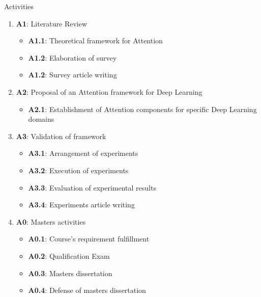 \documentclass[10pt]{beamer}
\begin{document}
\begin{frame}{Activities}
    \begin{enumerate}
        \item \textbf{A1}: Literature Review
        \begin{itemize}
            \item \textbf{A1.1}: Theoretical framework for Attention
            \item \textbf{A1.2}: Elaboration of survey
            \item \textbf{A1.2}: Survey article writing
        \end{itemize}
        \item \textbf{A2}: Proposal of an Attention framework for Deep Learning
        \begin{itemize}
            \item \textbf{A2.1}: Establishment of Attention components for specific Deep Learning domains
        \end{itemize}
        \item \textbf{A3}: Validation of framework
        \begin{itemize}
            \item \textbf{A3.1}: Arrangement of experiments
            \item \textbf{A3.2}: Execution of experiments
            \item \textbf{A3.3}: Evaluation of experimental results
            \item \textbf{A3.4}: Experiments article writing
        \end{itemize}
        \item \textbf{A0}: Masters activities
        \begin{itemize}
            \item \textbf{A0.1}: Course's requirement fulfillment
            \item \textbf{A0.2}: Qualification Exam
            \item \textbf{A0.3}: Masters dissertation
            \item \textbf{A0.4}: Defense of masters dissertation
        \end{itemize}
    \end{enumerate}
\end{frame}
\end{document}
